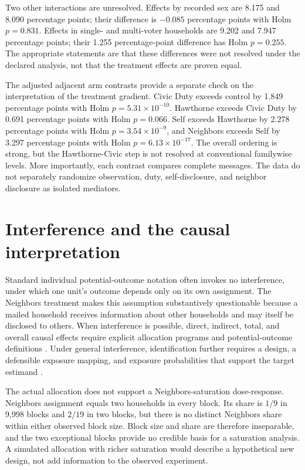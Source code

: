 \documentclass[a4paper,12pt]{article}
\begin{document}
Two other interactions are unresolved. Effects by recorded sex are 8.175 and 8.090 percentage points; their difference is $-0.085$ percentage points with Holm $p=0.831$. Effects in single- and multi-voter households are 9.202 and 7.947 percentage points; their 1.255 percentage-point difference has Holm $p=0.255$. The appropriate statements are that these differences were not resolved under the declared analysis, not that the treatment effects are proven equal.

The adjusted adjacent arm contrasts provide a separate check on the interpretation of the treatment gradient. Civic Duty exceeds control by 1.849 percentage points with Holm $p=5.31\times10^{-10}$. Hawthorne exceeds Civic Duty by 0.691 percentage points with Holm $p=0.066$. Self exceeds Hawthorne by 2.278 percentage points with Holm $p=3.54\times10^{-9}$, and Neighbors exceeds Self by 3.297 percentage points with Holm $p=6.13\times10^{-17}$. The overall ordering is strong, but the Hawthorne-Civic step is not resolved at conventional familywise levels. More importantly, each contrast compares complete messages. The data do not separately randomize observation, duty, self-disclosure, and neighbor disclosure as isolated mediators.

\section{Interference and the causal interpretation}

Standard individual potential-outcome notation often invokes no interference, under which one unit's outcome depends only on its own assignment. The Neighbors treatment makes this assumption substantively questionable because a mailed household receives information about other households and may itself be disclosed to others. When interference is possible, direct, indirect, total, and overall causal effects require explicit allocation programs and potential-outcome definitions \cite{hudgens2008}. Under general interference, identification further requires a design, a defensible exposure mapping, and exposure probabilities that support the target estimand \cite{aronow2017}.

The actual allocation does not support a Neighbors-saturation dose-response. Neighbors assignment equals two households in every block. Its share is $1/9$ in 9,998 blocks and $2/19$ in two blocks, but there is no distinct Neighbors share within either observed block size. Block size and share are therefore inseparable, and the two exceptional blocks provide no credible basis for a saturation analysis. A simulated allocation with richer saturation would describe a hypothetical new design, not add information to the observed experiment.
\end{document}
